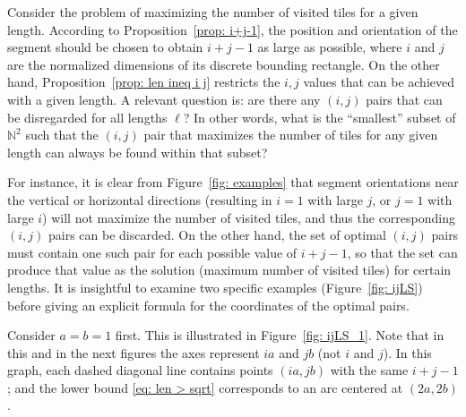 \documentclass[12pt, a4paper]{article}
\newcommand{\len}{\ell} %
\begin{document}
Consider the problem of maximizing the number of visited tiles for a given length. According to Proposition~\ref{prop: i+j-1}, the position and orientation of the segment should be chosen to obtain $i+j-1$ as large as possible, where $i$ and $j$ are the normalized dimensions of its discrete bounding rectangle. On the other hand, Proposition~\ref{prop: len ineq i j} restricts the $i, j$ values that can be achieved with a given length. A relevant question is: are there any $(i,j)$ pairs that can be disregarded for all lengths $\len$? In other words, what is the ``smallest'' subset of $\mathbb N^2$ such that the $(i,j)$ pair that maximizes the number of tiles for any given length can always be found within that subset?

For instance, it is clear from Figure~\ref{fig: examples} that segment orientations near the vertical or horizontal directions (resulting in $i=1$ with large $j$, or $j=1$ with large $i$) will not maximize the number of visited tiles, and thus the corresponding $(i,j)$ pairs can be discarded. On the other hand, the set of optimal $(i,j)$ pairs must contain one such pair for each possible value of $i+j-1$, so that the set can produce that value as the solution (maximum number of visited tiles) for certain lengths. It is insightful to examine two specific examples (Figure~\ref{fig: ijLS}) before giving an explicit formula for the coordinates of the optimal pairs.

Consider $a=b=1$ first. This is illustrated in Figure~\ref{fig: ijLS_1}. Note that in this and in the next figures the axes represent $ia$ and $jb$ (not $i$ and $j$). In this graph, each dashed diagonal line contains points $(ia,jb)$ with the same $i+j-1$; and the lower bound \eqref{eq: len > sqrt} corresponds to an arc centered at $(2a,2b)$.
\end{document}

